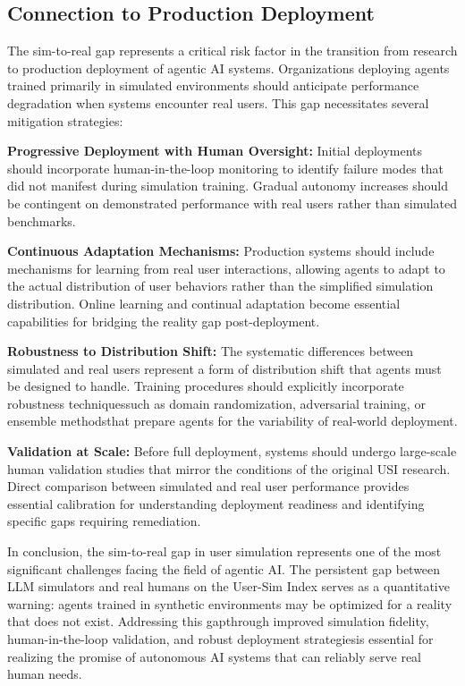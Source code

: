 \subsection{Connection to Production Deployment}

The sim-to-real gap represents a critical risk factor in the transition from research to production deployment of agentic AI systems. Organizations deploying agents trained primarily in simulated environments should anticipate performance degradation when systems encounter real users. This gap necessitates several mitigation strategies:

\textbf{Progressive Deployment with Human Oversight:} Initial deployments should incorporate human-in-the-loop monitoring to identify failure modes that did not manifest during simulation training. Gradual autonomy increases should be contingent on demonstrated performance with real users rather than simulated benchmarks.

\textbf{Continuous Adaptation Mechanisms:} Production systems should include mechanisms for learning from real user interactions, allowing agents to adapt to the actual distribution of user behaviors rather than the simplified simulation distribution. Online learning and continual adaptation become essential capabilities for bridging the reality gap post-deployment.

\textbf{Robustness to Distribution Shift:} The systematic differences between simulated and real users represent a form of distribution shift that agents must be designed to handle. Training procedures should explicitly incorporate robustness techniquessuch as domain randomization, adversarial training, or ensemble methodsthat prepare agents for the variability of real-world deployment.

\textbf{Validation at Scale:} Before full deployment, systems should undergo large-scale human validation studies that mirror the conditions of the original USI research. Direct comparison between simulated and real user performance provides essential calibration for understanding deployment readiness and identifying specific gaps requiring remediation.

In conclusion, the sim-to-real gap in user simulation represents one of the most significant challenges facing the field of agentic AI. The persistent gap between LLM simulators and real humans on the User-Sim Index serves as a quantitative warning: agents trained in synthetic environments may be optimized for a reality that does not exist. Addressing this gapthrough improved simulation fidelity, human-in-the-loop validation, and robust deployment strategiesis essential for realizing the promise of autonomous AI systems that can reliably serve real human needs.

